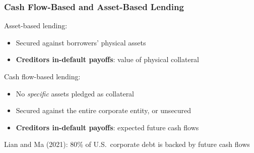 \documentclass[aspectratio=169,xcolor=table]{beamer}
\begin{document}
\begin{frame}[label = LandM] \frametitle{Cash Flow-Based and Asset-Based Lending \hfill \hyperlink{motivation}{}}

Asset-based lending:
\begin{itemize} \small
\item Secured against borrowers' physical assets
\item \textbf{Creditors in-default payoffs}: value of physical collateral
\end{itemize} \normalsize \vspace{4mm}

Cash flow-based lending:
\begin{itemize} \small
\item No \textit{specific} assets pledged as collateral
\item Secured against the entire corporate entity, or unsecured
\item \textbf{Creditors in-default payoffs}: expected future cash flows
\end{itemize} \normalsize  \vspace{4mm}

Lian and Ma (2021): 80\% of U.S.\ corporate debt is backed by future cash flows

\end{frame}
\end{document}
